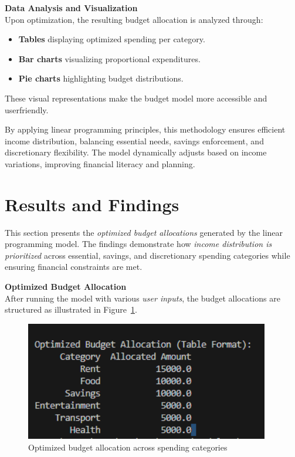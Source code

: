 \documentclass{article}
\begin{document}
\textbf{Data Analysis and Visualization} \\
Upon optimization, the resulting budget allocation is analyzed through:
\begin{itemize}
    \item \textbf{Tables} displaying optimized spending per category.
    \item \textbf{Bar charts} visualizing proportional expenditures.
    \item \textbf{Pie charts} highlighting budget distributions.
\end{itemize}
These visual representations make the budget model more accessible and userfriendly.

By applying linear programming principles, this methodology ensures efficient income distribution, balancing essential needs, savings enforcement, and discretionary flexibility. The model dynamically adjusts based on income variations, improving financial literacy and planning.

\section{Results and Findings}
This section presents the \textit{optimized budget allocations} generated by the linear programming model. The findings demonstrate how \textit{income distribution is prioritized} across essential, savings, and discretionary spending categories while ensuring financial constraints are met.

\textbf{Optimized Budget Allocation} \\
After running the model with various \textit{user inputs}, the budget allocations are structured as illustrated in Figure~\ref{fig:budget_allocation}.

\begin{figure}[h!]
    \centering
    \includegraphics[width=0.95\textwidth]{tablebg.png}
    \caption{Optimized budget allocation across spending categories}
    \label{fig:budget_allocation}
\end{figure}
\end{document}

